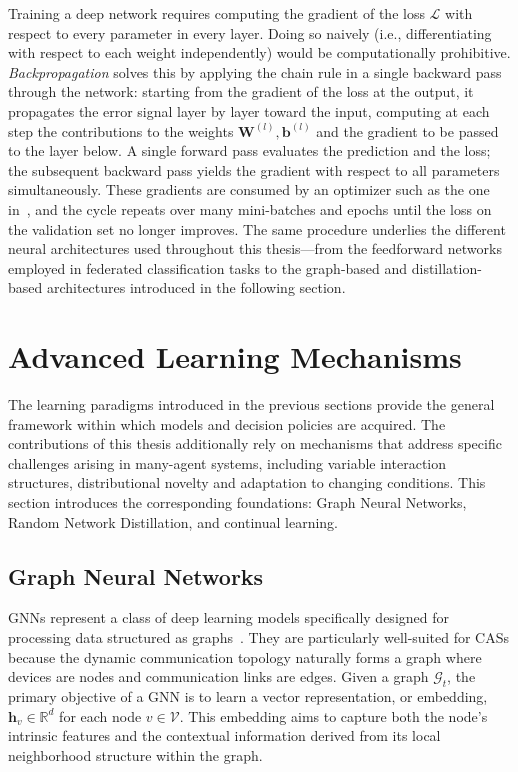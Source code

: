 Training a deep network requires computing the gradient of the loss $\mathcal{L}$
 with respect to every parameter in every layer.
%
Doing so naively 
 (i.e., differentiating with respect to each weight independently)
 would be computationally prohibitive.
%
\emph{Backpropagation} solves this by applying the chain rule in a single backward pass through the network:
 starting from the gradient of the loss at the output,
 it propagates the error signal layer by layer toward the input,
 computing at each step the contributions to the weights $\mathbf{W}^{(l)}, \mathbf{b}^{(l)}$
 and the gradient to be passed to the layer below.
%
A single forward pass evaluates the prediction and the loss;
 the subsequent backward pass yields the gradient with respect to all parameters simultaneously.
%
These gradients are consumed by an optimizer such as the one in~,
 and the cycle repeats over many mini-batches and epochs until the loss on the
 validation set no longer improves.
%
The same procedure underlies the different neural architectures used
 throughout this thesis---from the feedforward networks employed in federated classification tasks
 to the graph-based and distillation-based architectures introduced in the following section.


\section{Advanced Learning Mechanisms}
\label{sec:advanced-learning-mechanisms}

The learning paradigms introduced in the previous sections provide 
 the general framework within which models and decision policies are acquired.
%
The contributions of this thesis additionally rely 
 on mechanisms that address specific challenges arising in many-agent systems, 
 including variable interaction structures, distributional novelty 
 and adaptation to changing conditions.
%
This section introduces the corresponding foundations: 
 Graph Neural Networks, Random Network Distillation, and continual learning.

\subsection{Graph Neural Networks}
\label{subsec:graph-neural-networks}

\glspl{GNN} represent 
 a class of deep learning models specifically designed for processing 
 data structured as graphs~\cite{DBLP:journals/tnn/WuPCLZY21}. 
%
They are particularly well-suited for \glspl{CAS} because 
 the dynamic communication topology naturally forms a graph where devices are nodes 
 and communication links are edges.
% 
Given a graph \(\mathcal{G}_t\), 
 the primary objective of a GNN is to learn a vector representation,
  or embedding, 
  \(\mathbf{h}_v \in \mathbb{R}^d\) 
  for each node \(v \in \mathcal{V}\). 
%  
This embedding aims to capture both the node's intrinsic features 
 and the contextual information 
 derived from its local neighborhood structure within the graph.

